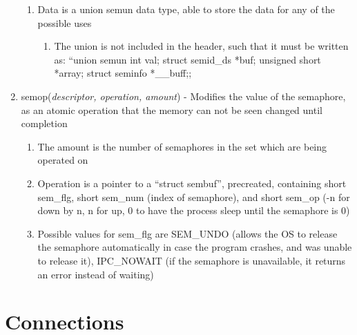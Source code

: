 \documentclass[11 pt, twoside]{article}
\begin{document}
\begin{enumerate}
\begin{enumerate}
\item Data is a union semun data type, able to store the data for any of the possible uses
\begin{enumerate}
\item The union is not included in the header, such that it must be written as: ``union semun {int val; struct semid\_ds *buf; unsigned short *array; struct seminfo *\_\_buff;};
\end{enumerate}
\end{enumerate}
\item semop(\textit{descriptor, operation, amount}) - Modifies the value of the semaphore, as an atomic operation that the memory can not be seen changed until completion 
\begin{enumerate}
\item The amount is the number of semaphores in the set which are being operated on
\item Operation is a pointer to a ``struct sembuf'', precreated, containing short sem\_flg, short sem\_num (index of semaphore), and short sem\_op (-n for down by n, n for up, 0 to have the process sleep until the semaphore is 0)
\item Possible values for sem\_flg are SEM\_UNDO (allows the OS to release the semaphore automatically in case the program crashes, and was unable to release it), IPC\_NOWAIT (if the semaphore is unavailable, it returns an error instead of waiting)
\end{enumerate}
\end{enumerate}

\section{Connections}
\end{document}
